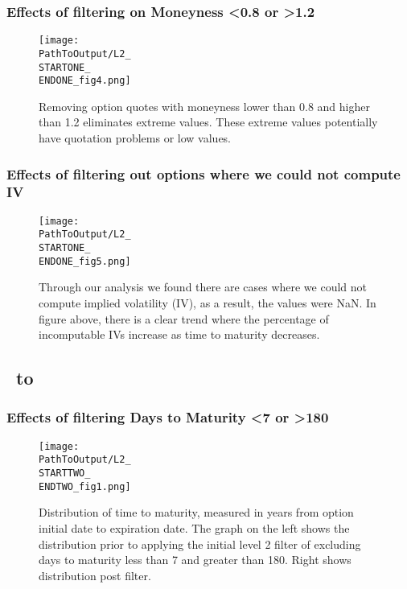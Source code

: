 \begin{appendix}
\subsubsection{Effects of filtering on Moneyness <0.8 or >1.2}
\begin{figure}[H] %
  \centering
{}
  \texttt{[image: \\PathToOutput/L2\_\\STARTONE\_\\ENDONE\_fig4.png]}%
\captionsetup{font=normalfont}
  \caption{Removing option quotes with moneyness lower than 0.8 and higher than 1.2 eliminates extreme values. These extreme values potentially have quotation problems or low values.}
  \label{fig:time1lvl2fig4}
\end{figure}


\subsubsection{Effects of filtering out options where we could not compute IV}
\begin{figure}[H] %
  \centering
{}
  \texttt{[image: \\PathToOutput/L2\_\\STARTONE\_\\ENDONE\_fig5.png]}%
\captionsetup{font=normalfont}
  \caption{Through our analysis we found there are cases where we could not compute implied volatility (IV), as a result, the values were NaN. In figure above, there is a clear trend where the percentage of incomputable IVs increase as time to maturity decreases.}
 \label{fig:time1lvl2fig5}
\end{figure}




\newpage
\subsection{\STARTTWO\ to \ENDTWO }

\subsubsection{Effects of filtering Days to Maturity <7 or >180}
\begin{figure}[H] %
  \centering
  \texttt{[image: \\PathToOutput/L2\_\\STARTTWO\_\\ENDTWO\_fig1.png]}%
\captionsetup{font=normalfont}
  \caption{Distribution of time to maturity, measured in years from option initial date to expiration date. The graph on the left shows the distribution prior to applying the initial level 2 filter of excluding days to maturity less than 7 and greater than 180. Right shows distribution post filter.}
\label{fig:time2lvl2fig1}
\end{figure}


\end{appendix}

